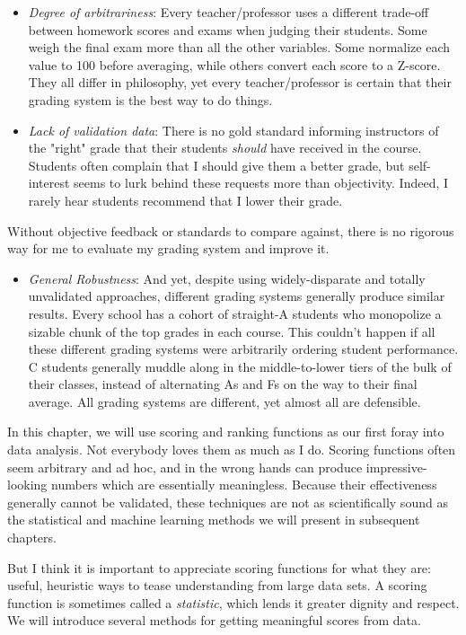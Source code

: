 \documentclass[10pt]{article}
\begin{document}
\begin{itemize}
  \item \textit{Degree of arbitrariness}: Every teacher/professor uses a different trade-off between homework scores and exams when judging their students. Some weigh the final exam more than all the other variables. Some normalize each value to 100 before averaging, while others convert each score to a Z-score. They all differ in philosophy, yet every teacher/professor is certain that their grading system is the best way to do things.
  \item \textit{Lack of validation data}: There is no gold standard informing instructors of the "right" grade that their students \textit{should} have received in the course. Students often complain that I should give them a better grade, but self-interest seems to lurk behind these requests more than objectivity. Indeed, I rarely hear students recommend that I lower their grade.
\end{itemize}

Without objective feedback or standards to compare against, there is no rigorous way for me to evaluate my grading system and improve it.

\begin{itemize}
  \item \textit{General Robustness}: And yet, despite using widely-disparate and totally unvalidated approaches, different grading systems generally produce similar results. Every school has a cohort of straight-A students who monopolize a sizable chunk of the top grades in each course. This couldn't happen if all these different grading systems were arbitrarily ordering student performance. C students generally muddle along in the middle-to-lower tiers of the bulk of their classes, instead of alternating As and Fs on the way to their final average. All grading systems are different, yet almost all are defensible.
\end{itemize}

In this chapter, we will use scoring and ranking functions as our first foray into data analysis. Not everybody loves them as much as I do. Scoring functions often seem arbitrary and ad hoc, and in the wrong hands can produce impressive-looking numbers which are essentially meaningless. Because their effectiveness generally cannot be validated, these techniques are not as scientifically sound as the statistical and machine learning methods we will present in subsequent chapters.

But I think it is important to appreciate scoring functions for what they are: useful, heuristic ways to tease understanding from large data sets. A scoring function is sometimes called a \textit{statistic}, which lends it greater dignity and respect. We will introduce several methods for getting meaningful scores from data.
\end{document}

